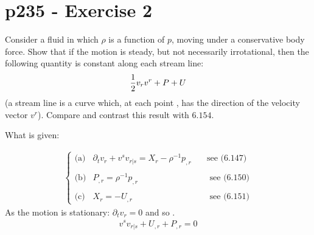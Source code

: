 \section{p235 - Exercise 2}
\begin{tcolorbox}
Consider a fluid in which $\rho$ is a function of $p$, moving under a conservative body force. Show that if the motion is steady, but not necessarily irrotational, then the following quantity is constant along each stream line:
$$\frac{1}{2} v_rv^r+P+U$$
(a stream line is a curve which, at each point , has the direction of the velocity vector $v^r$).
Compare and contrast this result with $\mathbf{6.154}$.
\end{tcolorbox}
What is given:

\begin{align}
\left\{\begin{array}{lll}
\text{(a)}&\partial_t v_r + v^sv_{r|s} = X_r- \rho^{-1} p_{,r}&\quad \text{see (6.147)}\\\\
\text{(b)}&P_{,r}= \rho^{-1} p_{,r}&\quad \text{ see (6.150)}\\\\
\text{(c)}&X_{r}= -U_{,r}&\quad \text{ see (6.151)}
\end{array}\right.
\end{align}
As the motion is stationary: $ \partial_t v_r =0$ and so .
\begin{align}
v^sv_{r|s} + U_{,r}+P_{,r}= 0
\end{align}

